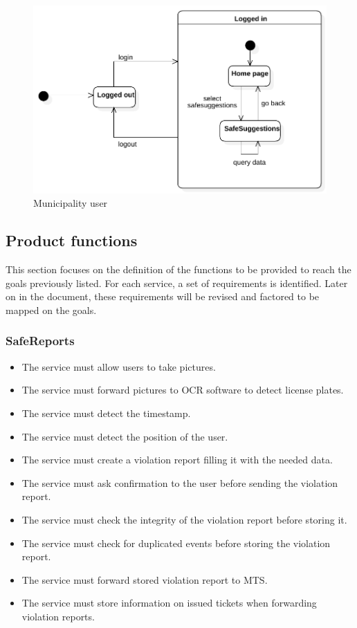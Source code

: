 \documentclass[a4paper]{article}
\begin{document}
\begin{figure}[H]
\centering
\includegraphics[width=\textwidth]{state_diagram_municipality_user}
\caption{Municipality user}
\end{figure}

\subsection{Product functions}

This section focuses on the definition of the functions to be provided
to reach the goals previously listed. For each service, a set of
requirements is identified. Later on in the document, these requirements
will be revised and factored to be mapped on the goals.

\subsubsection{SafeReports}

\begin{itemize}
\item
  The service must allow users to take pictures.
\item
  The service must forward pictures to OCR software to detect license
  plates.
\item
  The service must detect the timestamp.
\item
  The service must detect the position of the user.
\item
  The service must create a violation report filling it with the needed
  data.
\item
  The service must ask confirmation to the user before sending the
  violation report.
\item
  The service must check the integrity of the violation report before
  storing it.
\item
  The service must check for duplicated events before storing the
  violation report.
\item
  The service must forward stored violation report to MTS.
\item
  The service must store information on issued tickets when forwarding
  violation reports.
\end{itemize}
\end{document}
